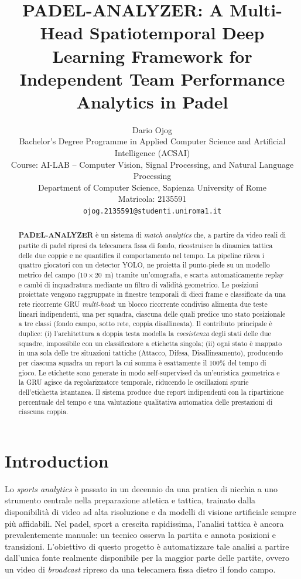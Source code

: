 \documentclass[10pt,twocolumn,a4paper]{article}
\title{\textbf{PADEL-ANALYZER: A Multi-Head Spatiotemporal Deep Learning
Framework for Independent Team Performance Analytics in Padel}}
\author{
	Dario Ojog\\
	Bachelor's Degree Programme in Applied Computer Science and Artificial Intelligence (ACSAI)\\
	Course: AI-LAB -- Computer Vision, Signal Processing, and Natural Language Processing\\
	Department of Computer Science, Sapienza University of Rome\\
	Matricola: 2135591\\
	\texttt{ojog.2135591@studenti.uniroma1.it}
}
\date{}
\begin{document}
	\maketitle

	\begin{abstract}
		\textbf{PADEL-ANALYZER} è un sistema di \emph{match analytics}
		che, a partire da video reali di partite di padel ripresi da telecamera
		fissa di fondo, ricostruisce la dinamica tattica delle due coppie e ne
		quantifica il comportamento nel tempo. La pipeline rileva i quattro
		giocatori con un detector YOLO, ne proietta il punto-piede su un modello
		metrico del campo ($10\times20$~m) tramite un'omografia, e scarta
		automaticamente replay e cambi di inquadratura mediante un filtro di
		validità geometrico. Le posizioni proiettate vengono raggruppate in
		finestre temporali di dieci frame e classificate da una rete ricorrente
		GRU \emph{multi-head}: un blocco ricorrente condiviso alimenta due teste
		lineari indipendenti, una per squadra, ciascuna delle quali predice uno
		stato posizionale a tre classi (fondo campo, sotto rete, coppia
		disallineata). Il contributo principale è duplice: (i) l'architettura a
		doppia testa modella la \emph{coesistenza} degli stati delle due squadre,
		impossibile con un classificatore a etichetta singola; (ii) ogni stato è
		mappato in una sola delle tre situazioni tattiche (Attacco, Difesa,
		Disallineamento), producendo per ciascuna squadra un report la cui somma
		è esattamente il 100\% del tempo di gioco. Le etichette sono generate in
		modo self-supervised da un'euristica geometrica e la GRU agisce da
		regolarizzatore temporale, riducendo le oscillazioni spurie
		dell'etichetta istantanea. Il sistema produce due report indipendenti con
		la ripartizione percentuale del tempo e una valutazione qualitativa
		automatica delle prestazioni di ciascuna coppia.
	\end{abstract}

	\section{Introduction}

	Lo \emph{sports analytics} è passato in un decennio da una pratica di nicchia
	a uno strumento centrale nella preparazione atletica e tattica, trainato
	dalla disponibilità di video ad alta risoluzione e da modelli di visione
	artificiale sempre più affidabili. Nel padel, sport a crescita rapidissima,
	l'analisi tattica è ancora prevalentemente manuale: un tecnico osserva la
	partita e annota posizioni e transizioni. L'obiettivo di questo progetto è
	automatizzare tale analisi a partire dall'unica fonte realmente disponibile
	per la maggior parte delle partite, ovvero un video di \emph{broadcast}
	ripreso da una telecamera fissa dietro il fondo campo.
\end{document}
